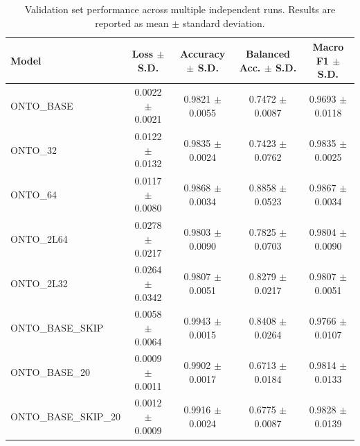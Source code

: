 \begin{table}[t]
\centering
\begin{tabular}{l c c c c}
\toprule
Model & Loss $\pm$ S.D. & Accuracy $\pm$ S.D. & Balanced Acc. $\pm$ S.D. & Macro F1 $\pm$ S.D. \\
\midrule
ONTO\_BASE & 0.0022 $\pm$ 0.0021 & 0.9821 $\pm$ 0.0055 & 0.7472 $\pm$ 0.0087 & 0.9693 $\pm$ 0.0118 \\
ONTO\_32 & 0.0122 $\pm$ 0.0132 & 0.9835 $\pm$ 0.0024 & 0.7423 $\pm$ 0.0762 & 0.9835 $\pm$ 0.0025 \\
ONTO\_64 & 0.0117 $\pm$ 0.0080 & 0.9868 $\pm$ 0.0034 & 0.8858 $\pm$ 0.0523 & 0.9867 $\pm$ 0.0034 \\
ONTO\_2L64 & 0.0278 $\pm$ 0.0217 & 0.9803 $\pm$ 0.0090 & 0.7825 $\pm$ 0.0703 & 0.9804 $\pm$ 0.0090 \\
ONTO\_2L32 & 0.0264 $\pm$ 0.0342 & 0.9807 $\pm$ 0.0051 & 0.8279 $\pm$ 0.0217 & 0.9807 $\pm$ 0.0051 \\
ONTO\_BASE\_SKIP & 0.0058 $\pm$ 0.0064 & 0.9943 $\pm$ 0.0015 & 0.8408 $\pm$ 0.0264 & 0.9766 $\pm$ 0.0107 \\
ONTO\_BASE\_20 & 0.0009 $\pm$ 0.0011 & 0.9902 $\pm$ 0.0017 & 0.6713 $\pm$ 0.0184 & 0.9814 $\pm$ 0.0133 \\
ONTO\_BASE\_SKIP\_20 & 0.0012 $\pm$ 0.0009 & 0.9916 $\pm$ 0.0024 & 0.6775 $\pm$ 0.0087 & 0.9828 $\pm$ 0.0139 \\
\bottomrule
\end{tabular}
\caption{Validation set performance across multiple independent runs. Results are reported as mean $\pm$ standard deviation.}
\label{tab:validation_results}
\end{table}